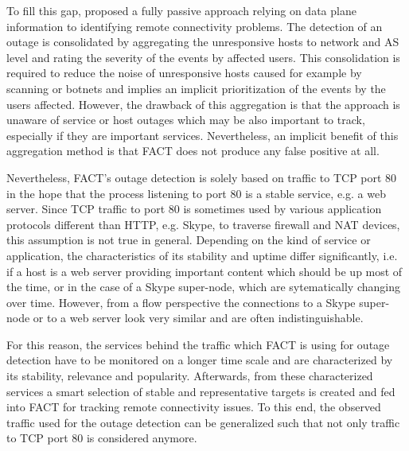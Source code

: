 To fill this gap, \citet{SchatzmannPAM2011} proposed a fully passive approach relying on data plane information to identifying remote connectivity problems. The detection of an outage is consolidated by aggregating the unresponsive hosts to network and AS level and rating the severity of the events by affected users. This consolidation is required to reduce the noise of unresponsive hosts caused for example by scanning or botnets and implies an implicit prioritization of the events by the users affected. However, the drawback of this aggregation is that the approach is unaware of service or host outages which may be also important to track, especially if they are important services. Nevertheless, an implicit benefit of this aggregation method is that FACT does not produce any false positive at all.

Nevertheless, FACT's outage detection is solely based on traffic to TCP port 80 in the hope that the process listening to port 80 is a stable service, e.g. a web server. Since TCP traffic to port 80 is sometimes used by various application protocols different than HTTP, e.g. Skype, to traverse firewall and NAT devices, this assumption is not true in general. Depending on the kind of service or application, the characteristics of its stability and uptime differ significantly, i.e. if a host is a web server providing important content which should be up most of the time, or in the case of a Skype super-node, which are sytematically changing over time. However, from a flow perspective the connections to a Skype super-node or to a web server look very similar and are often indistinguishable.

For this reason, the services behind the traffic which FACT is using for outage detection have to be monitored on a longer time scale and are characterized by its stability, relevance and popularity. Afterwards, from these characterized services a smart selection of stable and representative targets is created and fed into FACT for tracking remote connectivity issues. To this end, the observed traffic used for the outage detection can be generalized such that not only traffic to TCP port 80 is considered anymore. 

